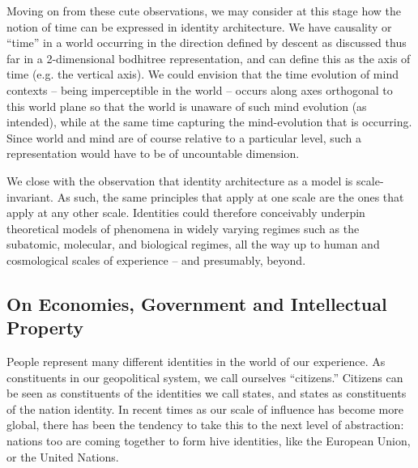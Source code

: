 \documentclass[pra,twocolumn,groupedaddress,10pt]{revtex4}
\theoremstyle{definition}
\begin{document}

Moving on from these cute observations, we may consider at this stage how the notion of time can be expressed in identity architecture. We have causality or ``time'' in a world occurring in the direction defined by descent as discussed thus far in a 2-dimensional bodhitree representation, and can define this as the axis of time (e.g. the vertical axis). We could envision that the time evolution of mind contexts -- being imperceptible in the world -- occurs along axes orthogonal to this world plane so that the world is unaware of such mind evolution (as intended), while at the same time capturing the mind-evolution that is occurring. Since world and mind are of course relative to a particular level, such a representation would have to be of uncountable dimension.

We close with the observation that identity architecture as a model is scale-invariant. As such, the same principles that apply at one scale are the ones that apply at any other scale. Identities could therefore conceivably underpin theoretical models of phenomena in widely varying regimes such as the subatomic, molecular, and biological regimes, all the way up to human and cosmological scales of experience -- and presumably, beyond.


\subsection{On Economies, Government and Intellectual Property} \label{sec:ecogovintpro}

People represent many different identities in the world of our experience. As constituents in our geopolitical system, we call ourselves ``citizens.'' Citizens can be seen as constituents of the identities we call states, and states as constituents of the nation identity. In recent times as our scale of influence has become more global, there has been the tendency to take this to the next level of abstraction: nations too are coming together to form hive identities, like the European Union, or the United Nations.
\end{document}
